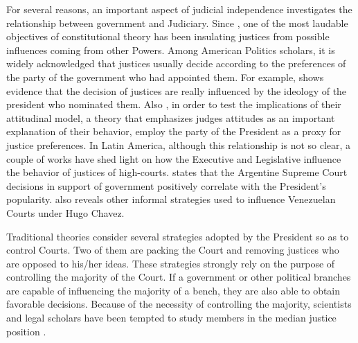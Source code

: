 \documentclass[12pt, a4paper]{article}
\begin{document}
For several reasons, an important aspect of judicial independence investigates the relationship 
between government and Judiciary. Since \citet{federalists}, one of the most laudable objectives of constitutional theory has been insulating justices from possible influences coming from other Powers. Among American Politics scholars, it is widely acknowledged
that justices usually decide according to the preferences of the party of the government who had appointed
them. For example, \citet[p. 20-22]{posner2010judges} shows evidence that the decision of justices are really influenced by the ideology  of the president who nominated them. Also \citet{segal2002supreme}, in order to test the implications of their attitudinal model, a 
theory 
that emphasizes judges attitudes as an important explanation of their behavior,  employ the party of the President as a proxy for justice preferences. In Latin America, although this relationship is not so clear, a couple of works have shed light on how the Executive and Legislative influence the behavior of justices of high-courts. \citet{helmke2002logic} states that the Argentine Supreme Court decisions in support of government positively correlate  with the President's popularity. \citet{taylor2014limits} also  reveals other informal strategies used to influence Venezuelan Courts under Hugo Chavez.


Traditional theories consider several strategies adopted by the President so as to control Courts. Two of them are packing the Court and removing justices who are opposed to his/her ideas. These strategies strongly rely on the purpose of controlling the majority of the Court.  If a government or other political branches are capable of influencing the majority of a bench, they are also able to obtain favorable decisions. Because of the necessity of controlling the majority, scientists and legal scholars have been tempted to study members in the median justice position \citep{martin2004median}.
\end{document}
